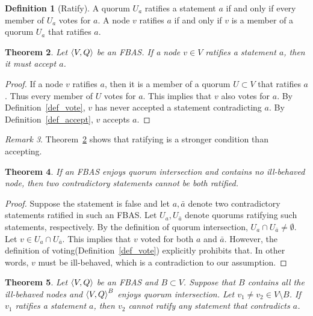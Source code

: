 \documentclass[12pt, psamsfonts]{amsart}
\newtheorem{thm}{Theorem}[subsection]
\theoremstyle{definition}
\newtheorem{defn}[thm]{Definition}
\theoremstyle{remark}
\newtheorem{rem}[thm]{Remark}
\numberwithin{equation}{subsection}
\begin{document}
\begin{defn}[Ratify]\label{def_ratify}
    A quorum $U_a$ ratifies a statement $a$ if and only if every member of $U_a$ votes for $a$.
    A node $v$ ratifies $a$ if and only if $v$ is a member of a quorum $U_a$ that ratifies $a$.
\end{defn}

\begin{thm}\label{ratify_implies_accept}
    Let $\ev{V, Q}$ be an FBAS\@.
    If a node $v \in V$ ratifies a statement $a$, then it must accept $a$.
\end{thm}

\begin{proof}
    If a node $v$ ratifies $a$, then it is a member of a quorum $U \subset V$ that ratifies $a$.
    Thus every member of $U$ votes for $a$.
    This implies that $v$ also votes for $a$.
    By Definition~\ref{def_vote}, $v$ has never accepted a statement contradicting $a$.
    By Definition~\ref{def_accept}, $v$ accepts $a$.
\end{proof}

\begin{rem}
    Theorem~\ref{ratify_implies_accept} shows that ratifying is a stronger condition than accepting.
\end{rem}

\begin{thm}
    If an FBAS enjoys quorum intersection and contains no ill-behaved node, then two contradictory statements cannot be both ratified.
\end{thm}

\begin{proof}
    Suppose the statement is false and let $a, \bar{a}$ denote two contradictory statements ratified in such an FBAS\@.
    Let $U_a, U_{\bar{a}}$ denote quorums ratifying such statements, respectively.
    By the definition of quorum intersection, $U_a \cap U_{\bar{a}} \ne \emptyset$.
    Let $v \in U_a \cap U_{\bar{a}}$.
    This implies that $v$ voted for both $a$ and $\bar{a}$.
    However, the definition of voting(Definition~\ref{def_vote}) explicitly prohibits that.
    In other words, $v$ must be ill-behaved, which is a contradiction to our assumption.
\end{proof}

\begin{thm}\label{ill_behaved_ratify}
    Let $\ev{V, Q}$ be an FBAS and $B \subset V$.
    Suppose that $B$ contains all the ill-behaved nodes and $\ev{V, Q}^B$ enjoys quorum intersection.
    Let $v_1 \ne v_2 \in V \setminus B$.
    If $v_1$ ratifies a statement $a$, then $v_2$ cannot ratify any statement that contradicts $a$.
\end{thm}
\end{document}
